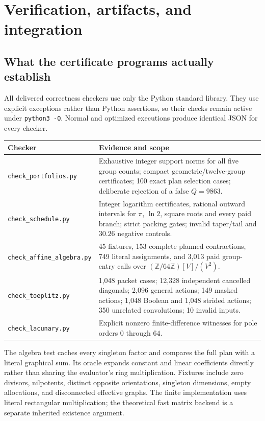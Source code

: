 \section{Verification, artifacts, and integration}
\label{sec:repro}

\subsection{What the certificate programs actually establish}
All delivered correctness checkers use only the Python standard library.
They use explicit exceptions rather than Python assertions, so their
checks remain active under \texttt{python3 -O}. Normal and optimized
executions produce identical JSON for every checker.
\begin{center}\small
\begin{tabular}{p{4.4cm}p{9.5cm}}
\toprule Checker & Evidence and scope\\\midrule
\texttt{check\_portfolios.py}&Exhaustive integer support norms for all five
group counts; compact geometric/twelve-group certificates; 100 exact plan
selection cases; deliberate rejection of a false $Q=9863$.\\
\texttt{check\_schedule.py}&Integer logarithm certificates, rational outward
intervals for $\pi$, $\ln2$, square roots and every paid branch; strict
packing gates; invalid taper/tail and $30.26$ negative controls.\\
\texttt{check\_affine\_algebra.py}&45 fixtures, 153 complete planned
contractions, 749 literal assignments, and 3,013 paid group-entry calls
over $(\mathbb Z/64\mathbb Z)[V]/(V^2)$.\\
\texttt{check\_toeplitz.py}&1,048 packet cases; 12,328 independent cancelled
diagonals; 2,096 general actions; 149 masked actions; 1,048 Boolean and
1,048 strided actions; 350 unrelated convolutions; 10 invalid inputs.\\
\texttt{check\_lacunary.py}&Explicit nonzero finite-difference witnesses
for pole orders $0$ through $64$.\\
\bottomrule
\end{tabular}
\end{center}
The algebra test caches every singleton factor and compares the full plan
with a literal graphical sum. Its oracle expands constant and linear
coefficients directly rather than sharing the evaluator's ring
multiplication. Fixtures include zero divisors, nilpotents, distinct
opposite orientations, singleton dimensions, empty allocations, and
disconnected effective graphs. The finite implementation uses literal
rectangular multiplication; the theoretical fast matrix backend is a
separate inherited existence argument.

